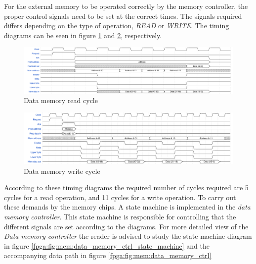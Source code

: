 For the external memory to be operated correctly by the memory controller, the proper control signals need to be set at the correct times. The signals required differs depending on the type of operation, \emph{READ} or \emph{WRITE}. The timing diagrams can be seen in figure \ref{fpga:fig:timing:dmem:read} and \ref{fpga:fig:timing:dmem:write}, respectively. 


\begin{figure}[H]
  \centering
  \includegraphics[width=\textwidth]{fpga/fig/timing/data_mem_read.pdf}
  \caption{Data memory read cycle}
  \label{fpga:fig:timing:dmem:read}
\end{figure}

\begin{figure}[H]
  \centering
  \includegraphics[width=\textwidth]{fpga/fig/timing/data_mem_write.pdf}
  \caption{Data memory write cycle}
  \label{fpga:fig:timing:dmem:write}
\end{figure}

According to these timing diagrams the required number of cycles required are 5 cycles for a read operation, and 11 cycles for a write operation. To carry out these demands by the memory chips. A state machine is implemented in the \emph{data memory controller}. This state machine is responsible for controlling that the different signals are set according to the diagrams. For more detailed view of the \emph{Data memory controller} the reader is advised to study the state machine diagram in figure \ref{fpga:fig:mem:data_memory_ctrl_state_machine} and the accompanying data path in figure \ref{fpga:fig:mem:data_memory_ctrl}





